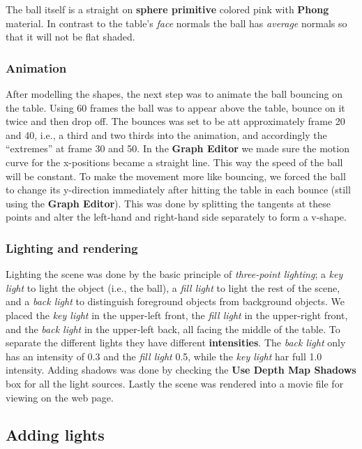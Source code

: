 \documentclass[a4paper]{article}
\begin{document}
The ball itself is a straight on \textbf{sphere primitive} colored pink with
\textbf{Phong} material. In contrast to the table's \textit{face} normals the
ball has \textit{average} normals so that it will not be flat shaded. 

\subsubsection{Animation}
After modelling the shapes, the next step was to animate the ball bouncing on
the table. Using 60 frames the ball was to appear above the table, bounce on it
twice and then drop off. The bounces was set to be att approximately frame 20
and 40, i.e., a third and two thirds into the animation, and accordingly the
``extremes'' at frame 30 and 50. In the \textbf{Graph Editor} we made sure the
motion curve for the x-positions became a straight line. This way the speed of
the ball will be constant. To make the movement more like bouncing, we forced
the ball to change its y-direction immediately after hitting the table in each
bounce (still using the \textbf{Graph Editor}). This was done by splitting the
tangents at these points and alter the left-hand and right-hand side separately
to form a v-shape. 

\subsubsection{Lighting and rendering}
Lighting the scene was done by the basic principle of \textit{three-point
lighting}; a \textit{key light} to light the object (i.e., the ball), a
\textit{fill light} to light the rest of the scene, and a \textit{back light} to
distinguish foreground objects from background objects. We placed the
\textit{key light} in the upper-left front, the \textit{fill light} in the
upper-right front, and the \textit{back light} in the upper-left back, all
facing the middle of the table. To separate the different lights they have
different \textbf{intensities}. The \textit{back light} only has an intensity of
0.3 and the \textit{fill light} 0.5, while the \textit{key light} har full 1.0
intensity. Adding shadows was done by checking the \textbf{Use Depth Map
Shadows} box for all the light sources. Lastly the scene was rendered into a
movie file for viewing on the web page.

\subsection{Adding lights} %
\end{document}

